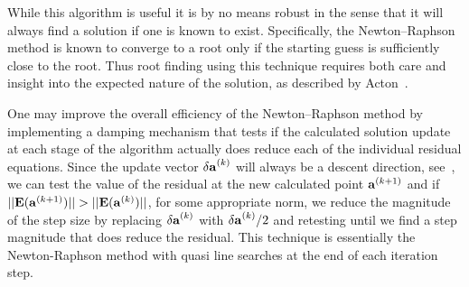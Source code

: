 While this algorithm is useful it is by no means robust in the sense that it will always find a solution if one is known to exist. Specifically, the Newton--Raphson method is known to converge to a root only if the starting guess is sufficiently close to the root. Thus root finding using this technique requires both care and insight into the expected nature of the solution, as described by Acton~\cite{Acton:NMW}.

One may improve the overall efficiency of the Newton--Raphson method by implementing a damping mechanism that tests if the calculated solution update at each stage of the algorithm actually does reduce each of the individual residual equations. Since the update vector $\mathbf{\delta a}^{(k)}$ will always be a descent direction, see~\cite{Press:NRC}, we can test the value of the residual at the new calculated point $\mathbf{a}^{(k+1)}$ and if $||\mathbf{E}(\mathbf{a}^{(k+1)})|| > ||\mathbf{E}(\mathbf{a}^{(k)})||$, for some appropriate norm, we reduce the magnitude of the step size by replacing $\mathbf{\delta a}^{(k)}$ with $\mathbf{\delta a}^{(k)}/2$ and retesting until we find a step magnitude that does reduce the residual. This technique is essentially the Newton-Raphson method with quasi line searches at the end of each iteration step.

